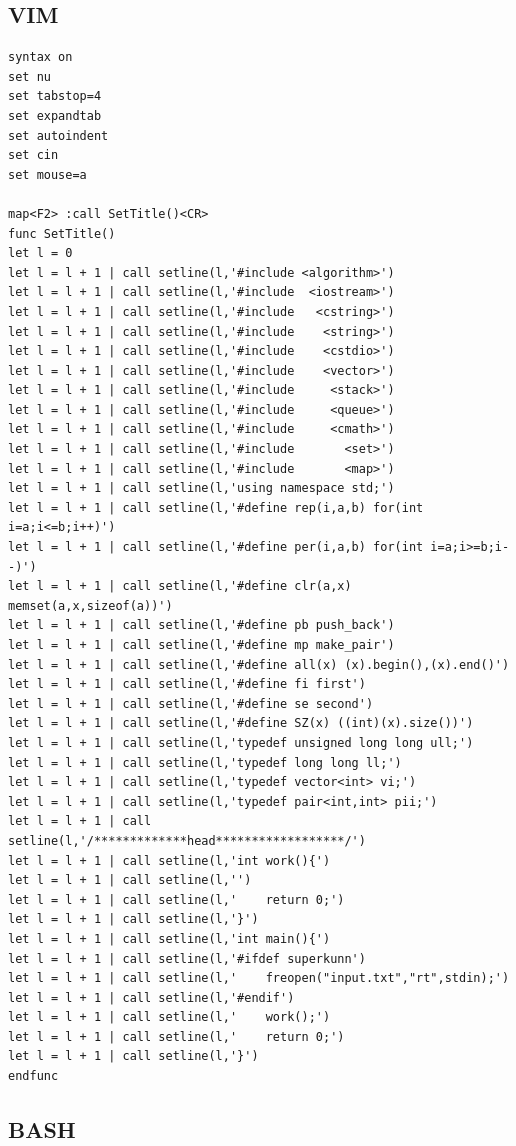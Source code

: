 \documentclass[twoside]{article}
\begin{document}
\subsection{VIM}
\begin{lstlisting}
syntax on
set nu
set tabstop=4
set expandtab
set autoindent
set cin
set mouse=a

map<F2> :call SetTitle()<CR>
func SetTitle()
let l = 0
let l = l + 1 | call setline(l,'#include <algorithm>')
let l = l + 1 | call setline(l,'#include  <iostream>')
let l = l + 1 | call setline(l,'#include   <cstring>')
let l = l + 1 | call setline(l,'#include    <string>')
let l = l + 1 | call setline(l,'#include    <cstdio>')
let l = l + 1 | call setline(l,'#include    <vector>')
let l = l + 1 | call setline(l,'#include     <stack>')
let l = l + 1 | call setline(l,'#include     <queue>')
let l = l + 1 | call setline(l,'#include     <cmath>')
let l = l + 1 | call setline(l,'#include       <set>')
let l = l + 1 | call setline(l,'#include       <map>')
let l = l + 1 | call setline(l,'using namespace std;')
let l = l + 1 | call setline(l,'#define rep(i,a,b) for(int i=a;i<=b;i++)')
let l = l + 1 | call setline(l,'#define per(i,a,b) for(int i=a;i>=b;i--)')
let l = l + 1 | call setline(l,'#define clr(a,x) memset(a,x,sizeof(a))')
let l = l + 1 | call setline(l,'#define pb push_back')
let l = l + 1 | call setline(l,'#define mp make_pair')
let l = l + 1 | call setline(l,'#define all(x) (x).begin(),(x).end()')
let l = l + 1 | call setline(l,'#define fi first')
let l = l + 1 | call setline(l,'#define se second')
let l = l + 1 | call setline(l,'#define SZ(x) ((int)(x).size())')
let l = l + 1 | call setline(l,'typedef unsigned long long ull;')
let l = l + 1 | call setline(l,'typedef long long ll;')
let l = l + 1 | call setline(l,'typedef vector<int> vi;')
let l = l + 1 | call setline(l,'typedef pair<int,int> pii;')
let l = l + 1 | call setline(l,'/*************head******************/')
let l = l + 1 | call setline(l,'int work(){')
let l = l + 1 | call setline(l,'')
let l = l + 1 | call setline(l,'    return 0;')
let l = l + 1 | call setline(l,'}')
let l = l + 1 | call setline(l,'int main(){')
let l = l + 1 | call setline(l,'#ifdef superkunn')
let l = l + 1 | call setline(l,'    freopen("input.txt","rt",stdin);')
let l = l + 1 | call setline(l,'#endif')
let l = l + 1 | call setline(l,'    work();')
let l = l + 1 | call setline(l,'    return 0;')
let l = l + 1 | call setline(l,'}')
endfunc
\end{lstlisting}
\subsection{BASH}
\end{document}
